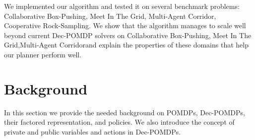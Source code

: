 \documentclass[letterpaper]{article} %
\newcommand{\guy}[1]{\textbf{[\color{orange}GUY:#1]}}
\newcommand{\cbp}[0]{Collaborative Box-Pushing}
\newcommand{\mitg}[0]{Meet In The Grid}
\newcommand{\crs}[0]{Cooperative Rock-Sampling}
\newcommand{\macor}[0]{Multi-Agent Corridor}
\begin{document}
We implemented our algorithm and tested it on several benchmark problems: \cbp, \mitg, \macor, \crs. We show that the algorithm manages to scale well beyond
current Dec-POMDP solvers on \cbp, \mitg ,\macor and explain the properties of these domains that help our planner perform well.




\section{Background}
In this section we provide the needed background on POMDPs, Dec-POMDPs, their factored representation,
and policies. We also introduce the concept of private and public variables and actions in Dec-POMDPs.
\end{document}
